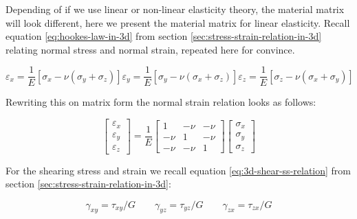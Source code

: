 Depending of if we use linear or non-linear elasticity theory, the
material matrix will look different, here we present the material
matrix for linear elasticity. Recall equation
\eqref{eq:hookes-law-in-3d} from section
\vref{sec:stress-strain-relation-in-3d} relating normal stress and
normal strain, repeated here for convince.

\begin{subequations}
\begin{equation*}
    \varepsilon_x = \frac {1}{E} \left [ \sigma_x - \nu \left (
        \sigma_y + \sigma_z \right ) \right ]
\end{equation*}
\begin{equation*} 
    \varepsilon_y = \frac {1}{E} \left [ \sigma_y - \nu \left (
        \sigma_x + \sigma_z \right ) \right ]  
\end{equation*}
\begin{equation*}
    \varepsilon_z = \frac {1}{E} \left [ \sigma_z - \nu \left (
        \sigma_x + \sigma_y \right ) \right ]  
\end{equation*}
\end{subequations}

Rewriting this on matrix form the normal strain relation looks as follows:

\begin{equation}
\begin{bmatrix}
\varepsilon_x \\ \varepsilon_y \\ \varepsilon_z
\end{bmatrix}
=
\frac{1}{E}
\begin{bmatrix}
  1 & - \nu & - \nu \\
  - \nu & 1 & - \nu \\
  - \nu & - \nu & 1
\end{bmatrix}
\begin{bmatrix}
  \sigma_x \\ \sigma_y \\ \sigma_z
\end{bmatrix}
\end{equation}

For the shearing stress and strain we recall equation
\eqref{eq:3d-shear-ss-relation} from section
\vref{sec:stress-strain-relation-in-3d}:

\begin{equation*}
  \gamma_{xy} = \tau_{xy} / G
  \qquad
  \gamma_{yz} = \tau_{yz} / G
  \qquad
  \gamma_{zx} = \tau_{zx} / G
\end{equation*}

